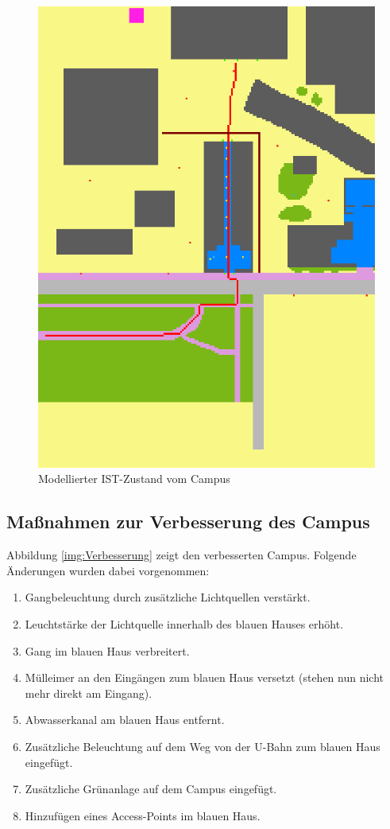 \documentclass[10pt]{scrartcl}
\begin{document}
	\begin{figure}[H]
                \includegraphics[width=\textwidth]{IST-Zustand}
        \caption{Modellierter IST-Zustand vom Campus}
        \label{img:IST}
	\end{figure}
	
\subsection{Maßnahmen zur Verbesserung des Campus}
Abbildung \ref{img:Verbesserung} zeigt den verbesserten Campus. Folgende Änderungen wurden dabei vorgenommen:

\begin{enumerate}
\item Gangbeleuchtung durch zusätzliche Lichtquellen verstärkt.
\item Leuchtstärke der Lichtquelle innerhalb des blauen Hauses erhöht.
\item Gang im blauen Haus verbreitert.
\item Mülleimer an den Eingängen zum blauen Haus versetzt (stehen nun nicht mehr direkt am Eingang).
\item Abwasserkanal am blauen Haus entfernt.
\item Zusätzliche Beleuchtung auf dem Weg von der U-Bahn zum blauen Haus eingefügt.
\item Zusätzliche Grünanlage auf dem Campus eingefügt.
\item Hinzufügen eines Access-Points im blauen Haus.
\end{enumerate}
\end{document}
